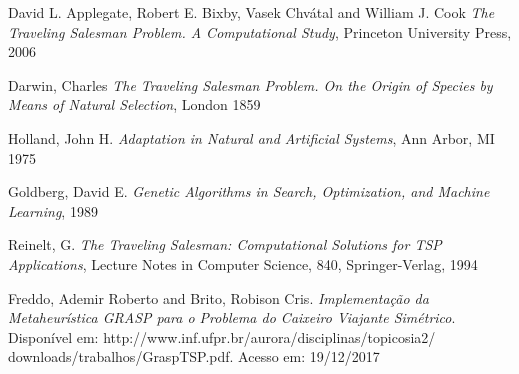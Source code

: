 \documentclass[
article,			%
11pt,				%
oneside,			%
a4paper,			%
english,			%
brazil,				%
sumario=tradicional
]{article}
\begin{document}
	\begin{thebibliography}{4}
		
		
		David L. Applegate, Robert E. Bixby, Vasek Chvátal and William J. Cook
		\emph{The Traveling Salesman Problem. A Computational Study},
		Princeton University Press,
		2006
		
		Darwin, Charles
		\emph{The Traveling Salesman Problem. On the Origin of Species by Means of Natural Selection},
		London
		1859
		
		Holland, John H.
		\emph{Adaptation in Natural and Artificial Systems},
		Ann Arbor, MI
		1975
		
		Goldberg, David E.
		\emph{Genetic Algorithms in Search, Optimization, and Machine Learning},
		1989
		
		Reinelt, G.
		\emph{The Traveling Salesman: Computational Solutions for TSP Applications},
		Lecture Notes in Computer Science, 840, Springer-Verlag,
		1994
		
		Freddo, Ademir Roberto and Brito, Robison Cris.
		\emph{Implementação da Metaheurística GRASP para o Problema
			do Caixeiro Viajante Simétrico}.
		Disponível em: http://www.inf.ufpr.br/aurora/disciplinas/topicosia2/
		downloads/trabalhos/GraspTSP.pdf.
		Acesso em: 19/12/2017
			
	\end{thebibliography}
	
\end{document}
